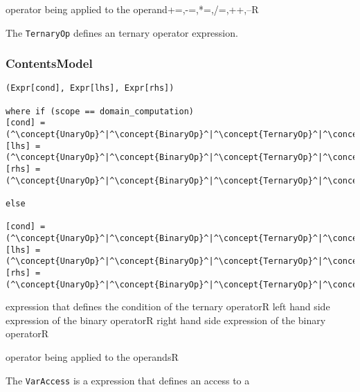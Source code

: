 \begin{HIRAttributesVal}
	{operator being applied to the operand}{+=,-=,*=,/=,++,--}{R}
\end{HIRAttributesVal}


The {\tt TernaryOp} defines an ternary operator expression.

\subsubsection*{ContentsModel}{}

\begin{lstlisting}[style=default]
(Expr[cond], Expr[lhs], Expr[rhs])

where if (scope == domain_computation)
[cond] = (^\concept{UnaryOp}^|^\concept{BinaryOp}^|^\concept{TernaryOp}^|^\concept{FieldAccess}^|^\concept{VarAccess}^|^\concept{Literal}^)
[lhs] = (^\concept{UnaryOp}^|^\concept{BinaryOp}^|^\concept{TernaryOp}^|^\concept{FieldAccess}^|^\concept{VarAccess}^|^\concept{Literal}^),
[rhs] =	(^\concept{UnaryOp}^|^\concept{BinaryOp}^|^\concept{TernaryOp}^|^\concept{FieldAccess}^|^\concept{VarAccess}^|^\concept{Literal}^)

else

[cond] = (^\concept{UnaryOp}^|^\concept{BinaryOp}^|^\concept{TernaryOp}^|^\concept{VarAccess}^|^\concept{Literal}^)
[lhs] = (^\concept{UnaryOp}^|^\concept{BinaryOp}^|^\concept{TernaryOp}^|^\concept{VarAccess}^|^\concept{Literal}^)
[rhs] = (^\concept{UnaryOp}^|^\concept{BinaryOp}^|^\concept{TernaryOp}^|^\concept{VarAccess}^|^\concept{Literal}^)
\end{lstlisting}

\begin{HIRChildElements}
	\HIRElementDef{[cond]}
	{expression that defines the condition of the ternary operator}{R}
	\HIRElementDef{[lhs]}
	{left hand side expression of the binary operator}{R}
	\HIRElementDef{[rhs]}
	{right hand side expression of the binary operator}{R}
\end{HIRChildElements}

\begin{HIRAttributes}
	{operator being applied to the operands}{R}
\end{HIRAttributes}


The {\tt VarAccess} is a expression that defines an access to a 

